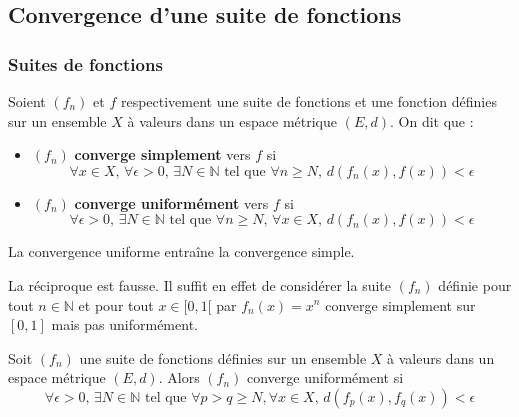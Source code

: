 




  \subsection{Convergence d'une suite de fonctions}

  \subsubsection{Suites de fonctions}


  \begin{definition}
    Soient $(f_n)$ et $f$ respectivement une suite de fonctions et une fonction définies sur un ensemble $X$ à valeurs dans un espace métrique $(E, d)$. On dit que :
    \begin{itemize}
      \item $(f_n)$ \textbf{converge simplement} vers $f$ si
      \[ \forall x \in X, \, \forall \epsilon > 0, \, \exists N \in \mathbb{N} \text{ tel que } \forall n \geq N, \, d(f_n(x), f(x)) < \epsilon \]
      \item $(f_n)$ \textbf{converge uniformément} vers $f$ si
      \[ \forall \epsilon > 0, \, \exists N \in \mathbb{N} \text{ tel que } \forall n \geq N, \, \forall x \in X, \, d(f_n(x), f(x)) < \epsilon \]
    \end{itemize}
  \end{definition}

  \begin{proposition}
    La convergence uniforme entraîne la convergence simple.
  \end{proposition}

  \begin{cexample}
    La réciproque est fausse. Il suffit en effet de considérer la suite $(f_n)$ définie pour tout $n \in \mathbb{N}$ et pour tout $x \in [0,1[$ par $f_n(x) = x^n$ converge simplement sur $[0,1]$ mais pas uniformément.
  \end{cexample}

  \begin{theorem}
    Soit $(f_n)$ une suite de fonctions définies sur un ensemble $X$ à valeurs dans un espace métrique $(E, d)$. Alors $(f_n)$ converge uniformément si
    \[ \forall \epsilon > 0, \, \exists N \in \mathbb{N} \text{ tel que } \forall p > q \geq N, \forall x \in X, \, d(f_p(x), f_q(x)) < \epsilon \]
  \end{theorem}

